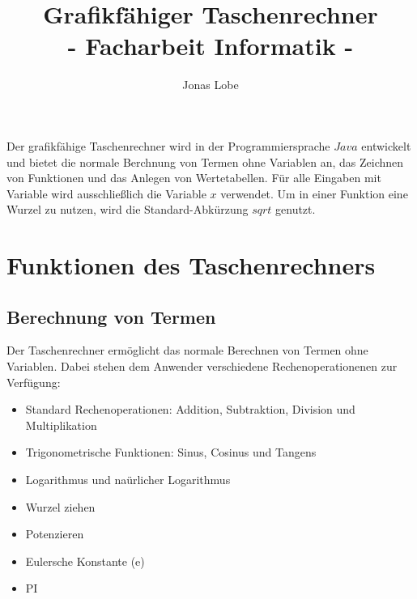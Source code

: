 \documentclass[12pt,a4paper]{article}
\begin{document}
    \setlength{\parindent}{0mm}
    \setcounter{tocdepth}{4}
    \pagestyle{plain}

    \title{Grafikfähiger Taschenrechner \\[1ex] \large - Facharbeit Informatik -}
    \date{}
    \author{Jonas Lobe}

    \maketitle
    \newpage

    \tableofcontents

    \newpage

    Der grafikfähige Taschenrechner wird in der Programmiersprache $Java$ entwickelt und bietet die normale Berchnung
    von Termen ohne Variablen an, das Zeichnen von Funktionen und das Anlegen von Wertetabellen.
    Für alle Eingaben mit Variable wird ausschließlich die Variable $x$ verwendet.
    Um in einer Funktion eine Wurzel zu nutzen, wird die Standard-Abkürzung $sqrt$ genutzt.


    \section{Funktionen des Taschenrechners}

    \subsection{Berechnung von Termen} \label{subsection:calculator}
    Der Taschenrechner ermöglicht das normale Berechnen von Termen ohne Variablen.
    Dabei stehen dem Anwender verschiedene Rechenoperationenen zur Verfügung:

    \begin{itemize}
        \item Standard Rechenoperationen: Addition, Subtraktion, Division und Multiplikation
        \item Trigonometrische Funktionen: Sinus, Cosinus und Tangens
        \item Logarithmus und naürlicher Logarithmus
        \item Wurzel ziehen
        \item Potenzieren
        \item Eulersche Konstante (e)
        \item PI
    \end{itemize}
\end{document}
